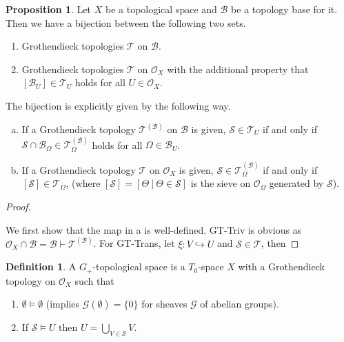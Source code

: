 \documentclass[10pt]{article}
\numberwithin{equation}{section}
\theoremstyle{definition}
\newtheorem{proposition}{Proposition}[subsection]
\newtheorem{definition}{Definition}[subsection]
\newcommand{\Ouv}{\mathscr{O}}
\newcommand{\sep}[0]{\:|\:}
\newcommand{\sS}[0]{\mathscr{S}}
\newcommand{\cB}[0]{\mathcal{B}}
\newcommand{\cT}[0]{\mathcal{T}}
\begin{document}
\begin{proposition}
    \label{proposition_9_1}
    Let $X$ be a topological space and $\cB$ be a topology base for it. Then we have a bijection between the following two sets.
    \begin{enumerate}[1.]
        \item Grothendieck topologies $\mathcal{T}$ on $\cB$.
        \item Grothendieck topologies $\mathcal{T}$ on $\Ouv_X$ with the additional property that $[\cB_U]\in\mathcal{T}_U$ holds for all $U\in\Ouv_X$.
    \end{enumerate}
    The bijection is explicitly given by the following way.
    \begin{enumerate}[a.]
        \item If a Grothendieck topology $\mathcal{T}^{(\cB)}$ on $\cB$ is given, $\sS\in\mathcal{T}_U$ if and only if $\sS\cap\cB_\Omega\in\mathcal{T}_\Omega^{(\cB)}$ holds for all $\Omega\in\cB_U$.
        \item If a Grothendieck topology $\mathcal{T}$ on $\Ouv_X$ is given, $\sS\in\mathcal{T}_\Omega^{(\cB)}$ if and only if $[\sS]\in\mathcal{T}_\Omega$, (where $[\sS]=[\Theta\sep \Theta\in\sS]$ is the sieve on $\Ouv_\Omega$ generated by $\sS$).
    \end{enumerate}
\end{proposition}
\begin{proof}$\:$
    \par We first show that the map in a is well-defined. GT-Triv is obvious as $\Ouv_X\cap\mathcal{B} = \mathcal{B}\vdash\mathcal{T}^{(\mathcal{B})}$. For GT-Trans, let $\xi:V\hookrightarrow U$ and $\sS\in\cT$, then
\end{proof}
\begin{definition}
    \label{definition_9_4}
    A $G_+$-topological space is a $T_0$-space $X$ with a Grothendieck topology on $\Ouv_X$ such that
    \begin{enumerate}
        \item $\emptyset\vDash \emptyset$ (implies $\mathcal{G}(\emptyset)=\{0\}$ for sheaves $\mathcal{G}$ of abelian groups).
        \item If $\sS\vDash U$ then $U = \bigcup_{V\in\sS}V$.
    \end{enumerate}
\end{definition}
\end{document}
